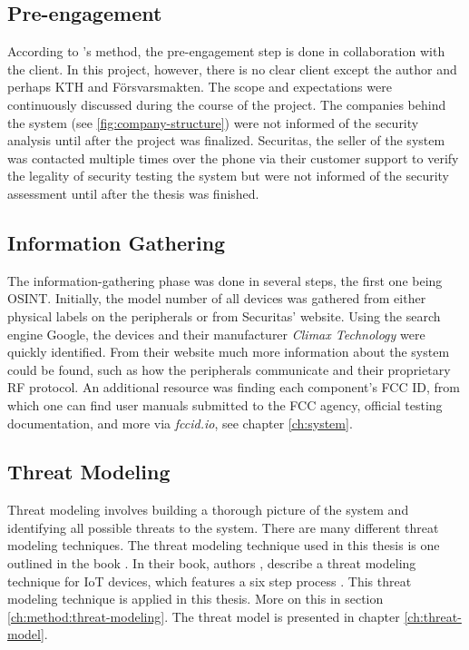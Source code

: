 \subsection{Pre-engagement}
According to \citeauthor{weidman2014}'s method, the pre-engagement step is done in collaboration with the client. In this project, however, there is no clear client except the author and perhaps KTH and Försvarsmakten. The scope and expectations were continuously discussed during the course of the project. The companies behind the system (see \ref{fig:company-structure}) were not informed of the security analysis until after the project was finalized. Securitas, the seller of the system was contacted multiple times over the phone via their customer support to verify the legality of security testing the system but were not informed of the security assessment until after the thesis was finished.

\subsection{Information Gathering}
The information-gathering phase was done in several steps, the first one being \gls{OSINT}. Initially, the model number of all devices was gathered from either physical labels on the peripherals or from Securitas' website. Using the search engine Google, the devices and their manufacturer \textit{Climax Technology} were quickly identified. From their website much more information about the system could be found, such as how the peripherals communicate and their proprietary \gls{RF} protocol. An additional resource was finding each component's FCC ID, from which one can find user manuals submitted to the FCC agency, official testing documentation, and more via \textit{fccid.io}, see chapter \ref{ch:system}.

\subsection{Threat Modeling}
Threat modeling involves building a thorough picture of the system and identifying all possible threats to the system. There are many different threat modeling techniques. The threat modeling technique used in this thesis is one outlined in the book . In their book, authors \citeauthor{guzman2017iot}, describe a threat modeling technique for IoT devices, which features a six step process \cite{guzman2017iot}. This threat modeling technique is applied in this thesis. More on this in section \ref{ch:method:threat-modeling}. The threat model is presented in chapter \ref{ch:threat-model}.

